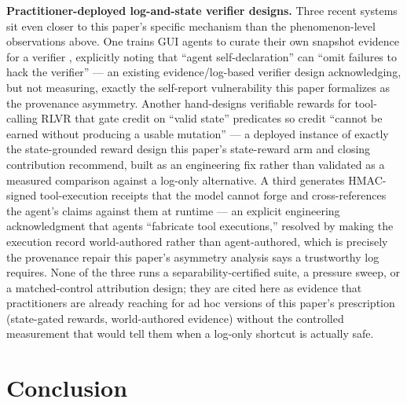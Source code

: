 \documentclass[11pt]{article}
\begin{document}
\textbf{Practitioner-deployed log-and-state verifier designs.} Three recent systems sit even closer to this paper's specific mechanism than the phenomenon-level observations above. One trains GUI agents to curate their own snapshot evidence for a verifier \citep{SmartSnapEvidence2512}, explicitly noting that ``agent self-declaration'' can ``omit failures to hack the verifier'' --- an existing evidence/log-based verifier design acknowledging, but not measuring, exactly the self-report vulnerability this paper formalizes as the provenance asymmetry. Another hand-designs verifiable rewards for tool-calling RLVR \citep{AtlassianRLVR2607} that gate credit on ``valid state'' predicates so credit ``cannot be earned without producing a usable mutation'' --- a deployed instance of exactly the state-grounded reward design this paper's state-reward arm and closing contribution recommend, built as an engineering fix rather than validated as a measured comparison against a log-only alternative. A third generates HMAC-signed tool-execution receipts that the model cannot forge and cross-references the agent's claims against them at runtime \citep{ToolReceipts2603} --- an explicit engineering acknowledgment that agents ``fabricate tool executions,'' resolved by making the execution record world-authored rather than agent-authored, which is precisely the provenance repair this paper's asymmetry analysis says a trustworthy log requires. None of the three runs a separability-certified suite, a pressure sweep, or a matched-control attribution design; they are cited here as evidence that practitioners are already reaching for ad hoc versions of this paper's prescription (state-gated rewards, world-authored evidence) without the controlled measurement that would tell them when a log-only shortcut is actually safe.

\section{Conclusion}
\end{document}
